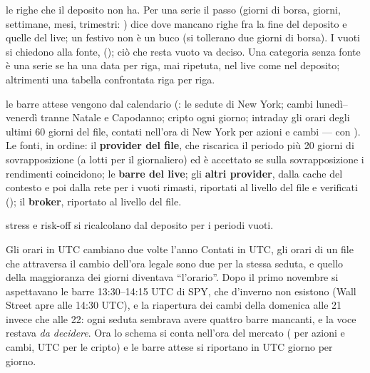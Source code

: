 \begin{description}[leftmargin = 1.4em, style = nextline, itemsep = 4pt]
  \item[Categorie] le righe che il deposito non ha. Per una serie il passo
    (giorni di borsa, giorni, settimane, mesi, trimestri:
    ) dice dove mancano righe fra la fine del deposito e
    quelle del live; un festivo non è un buco (si tollerano due giorni di
    borsa). I vuoti si chiedono alla fonte, 
    (); ciò che resta vuoto va deciso. Una categoria
    senza fonte è una serie se ha una data per riga, mai ripetuta, nel live
    come nel deposito; altrimenti una tabella confrontata riga per riga.
  \item[Asset e driver] le barre attese vengono dal calendario
    (: le sedute di New York; cambi lunedì--venerdì tranne
    Natale e Capodanno; cripto ogni giorno; intraday gli orari degli ultimi
    \num{60} giorni del file, contati nell'ora di New York per azioni e cambi
    ---  con ). Le fonti, in ordine: il \textbf{provider del
    file}, che riscarica il periodo più \num{20} giorni di sovrapposizione
    (a lotti per il giornaliero) ed è accettato se sulla sovrapposizione i
    rendimenti coincidono; le \textbf{barre del live}; gli \textbf{altri
    provider}, dalla cache del contesto e poi dalla rete per i vuoti
    rimasti, riportati al livello del file e verificati
    (); il \textbf{broker}, riportato al livello del file.
  \item[Serie calcolate] stress e risk-off si ricalcolano dal deposito per i
    periodi vuoti.
\end{description}

\begin{attenzione}{Gli orari in UTC cambiano due volte l'anno}
Contati in UTC, gli orari di un file che attraversa il cambio dell'ora legale
sono due per la stessa seduta, e quello della maggioranza dei giorni diventava
\enquote{l'orario}. Dopo il primo novembre si aspettavano le barre
13:30--14:15 UTC di SPY, che d'inverno non esistono (Wall Street apre alle
14:30 UTC), e la riapertura dei cambi della domenica alle 21 invece che alle
22: ogni seduta sembrava avere quattro barre mancanti, e la voce restava
\emph{da decidere}. Ora lo schema si conta nell'ora del mercato
( per azioni e cambi, UTC per le cripto) e le barre
attese si riportano in UTC giorno per giorno.
\end{attenzione}

